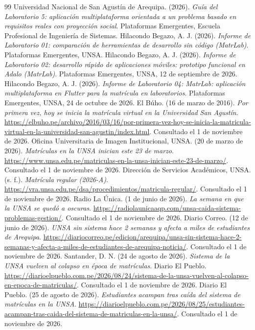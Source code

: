 \begin{thebibliography}{99}
 Universidad Nacional de San Agustín de Arequipa. (2026). \emph{Guía del Laboratorio 5: aplicación multiplataforma orientada a un problema basado en requisitos reales con proyección social}. Plataformas Emergentes, Escuela Profesional de Ingeniería de Sistemas.
 Hilacondo Begazo, A. J. (2026). \emph{Informe de Laboratorio 01: comparación de herramientas de desarrollo sin código (MatrLab)}. Plataformas Emergentes, UNSA.
 Hilacondo Begazo, A. J. (2026). \emph{Informe de Laboratorio 02: desarrollo rápido de aplicaciones móviles: prototipo funcional en Adalo (MatrLab)}. Plataformas Emergentes, UNSA, 12 de septiembre de 2026.
 Hilacondo Begazo, A. J. (2026). \emph{Informe de Laboratorio 04: MatrLab: aplicación multiplataforma en Flutter para la matrícula en laboratorios}. Plataformas Emergentes, UNSA, 24 de octubre de 2026.
 El Búho. (16 de marzo de 2016). \emph{Por primera vez, hoy se inicia la matrícula virtual en la Universidad San Agustín}. \url{https://elbuho.pe/archivo/2016/03/16/por-primera-vez-hoy-se-inicia-la-matricula-virtual-en-la-universidad-san-agustin/index.html}. Consultado el 1 de noviembre de 2026.
 Oficina Universitaria de Imagen Institucional, UNSA. (20 de marzo de 2026). \emph{Matrículas en la UNSA inician este 23 de marzo}. \url{https://www.unsa.edu.pe/matriculas-en-la-unsa-inician-este-23-de-marzo/}. Consultado el 1 de noviembre de 2026.
 Dirección de Servicios Académicos, UNSA. (s. f.). \emph{Matrícula regular (2026-A)}. \url{https://vra.unsa.edu.pe/dsa/procedimientos/matricula-regular/}. Consultado el 1 de noviembre de 2026.
 Radio La Única. (1 de junio de 2026). \emph{La semana en que la UNSA se quedó a oscuras}. \url{https://radiolaunicaaqp.com/unsa-caida-sistema-problemas-gestion/}. Consultado el 1 de noviembre de 2026.
 Diario Correo. (12 de junio de 2026). \emph{UNSA sin sistema hace 2 semanas y afecta a miles de estudiantes de Arequipa}. \url{https://diariocorreo.pe/edicion/arequipa/unsa-sin-sistema-hace-2-semanas-y-afecta-a-miles-de-estudiantes-de-arequipa-noticia/}. Consultado el 1 de noviembre de 2026.
 Santander, D. N. (24 de agosto de 2026). \emph{Sistema de la UNSA vuelven al colapso en época de matrículas}. Diario El Pueblo. \url{https://diarioelpueblo.com.pe/2026/08/24/sistema-de-la-unsa-vuelven-al-colapso-en-epoca-de-matriculas/}. Consultado el 1 de noviembre de 2026.
 Diario El Pueblo. (25 de agosto de 2026). \emph{Estudiantes acampan tras caída del sistema de matrículas en la UNSA}. \url{https://diarioelpueblo.com.pe/2026/08/25/estudiantes-acampan-tras-caida-del-sistema-de-matriculas-en-la-unsa/}. Consultado el 1 de noviembre de 2026.

\end{thebibliography}
